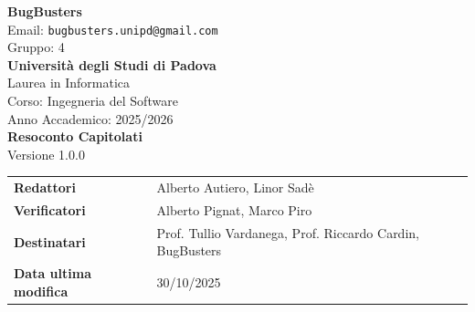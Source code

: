 \documentclass[a4paper,11pt]{article}
\newcommand{\CurrentVersion}{1.0.0} %
\begin{document}
\pagestyle{fancy}
\fancyhf{} %


\fancyfoot[R]{ \nouppercase{\rightmark}} %


\renewcommand{\headrulewidth}{0pt} %
\renewcommand{\footrulewidth}{0pt} %


\begin{center}
 \thispagestyle{empty}
 {\Large\bfseries BugBusters}\\[0.3cm]
 {\small\color{darkgray} Email: \texttt{bugbusters.unipd@gmail.com}} \\[0.1cm]
 {\small\color{darkgray} Gruppo: 4} \\[0.5cm]

 {\large\bfseries Università degli Studi di Padova}\\[0.3cm]
 {\small Laurea in Informatica}\\[0.2cm]
 {\small Corso: Ingegneria del Software}\\[0.2cm]
 {\small Anno Accademico: 2025/2026}\\[0.8cm]

 {\Huge\bfseries\color{primaryblue} Resoconto Capitolati}\\[0.8cm]
 {\Large\color{secondaryblue}Versione \CurrentVersion}\\[0.8cm]
\end{center}

\begin{center}
\begin{tcolorbox}[colback=lightgray,colframe=primaryblue,width=0.85\textwidth,arc=3mm,boxrule=0.5pt]
\begin{tabularx}{\linewidth}{@{}lX@{}}
\textbf{Redattori} & Alberto Autiero, Linor Sadè \\
\textbf{Verificatori} & Alberto Pignat, Marco Piro \\
\textbf{Destinatari} & Prof. Tullio Vardanega, Prof. Riccardo Cardin, BugBusters \\
\textbf{Data ultima modifica}     & 30/10/2025 \\
\end{tabularx}
\end{tcolorbox}
\end{center}
\end{document}
